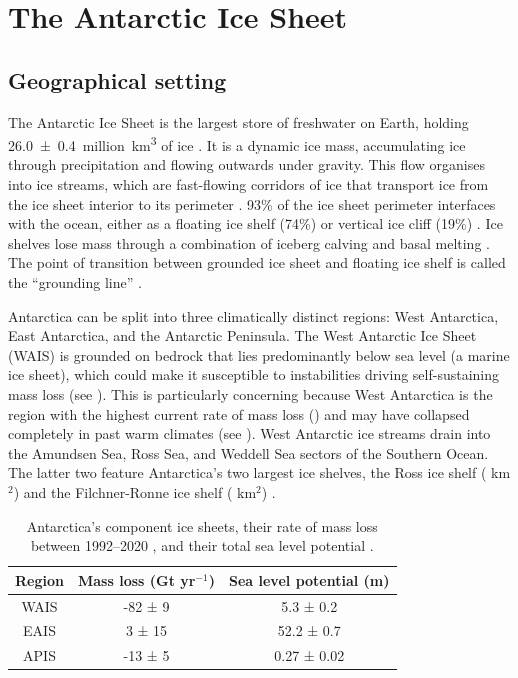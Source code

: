 \section{The Antarctic Ice Sheet}

\subsection{Geographical setting}

The Antarctic Ice Sheet is the largest store of freshwater on Earth, holding 26.0~±~0.4~million~km\textsuperscript{3} of ice \citep{morlighemDeepGlacialTroughs2020}. It is a dynamic ice mass, accumulating ice through precipitation and flowing outwards under gravity. This flow organises into ice streams, which are fast-flowing corridors of ice that transport ice from the ice sheet interior to its perimeter \citep{morlighemMEaSUREsBedMachineAntarctica2020}. 93\% of the ice sheet perimeter interfaces with the ocean, either as a floating ice shelf (74\%) or vertical ice cliff (19\%) \citep{bindschadlerGettingAntarcticaNew2011}. Ice shelves lose mass through a combination of iceberg calving and basal melting \citep{davisonAnnualMassBudget2023}. The point of transition between grounded ice sheet and floating ice shelf is called the ``grounding line'' \citep{friedlRemoteSensingGlacier2020}.

Antarctica can be split into three climatically distinct regions: West Antarctica, East Antarctica, and the Antarctic Peninsula. The West Antarctic Ice Sheet (WAIS) is grounded on bedrock that lies predominantly below sea level (a marine ice sheet), which could make it susceptible to instabilities driving self-sustaining mass loss (see ). This is particularly concerning because West Antarctica is the region with the highest current rate of mass loss () and may have collapsed completely in past warm climates (see ). West Antarctic ice streams drain into the Amundsen Sea, Ross Sea, and Weddell Sea sectors of the Southern Ocean. The latter two feature Antarctica's two largest ice shelves, the Ross ice shelf ( km$^2$) and the Filchner-Ronne ice shelf ( km$^2$) .

\begin{table}[h]
    \renewcommand{\arraystretch}{1.5}
    \centering
    \caption{Antarctica's component ice sheets, their rate of mass loss between 1992--2020 \citep{otosakaMassBalanceGreenland2023a}, and their total sea level potential \citep{morlighemDeepGlacialTroughs2020}.}
    \begin{tabular}{ccc}
        \toprule
        Region & Mass loss (Gt yr$^{-1}$) & Sea level potential (m) \\
        \midrule
        WAIS & -82 ± 9 & 5.3 ± 0.2 \\
        EAIS & 3 ± 15 & 52.2 ± 0.7 \\
        APIS & -13 ± 5 & 0.27 ± 0.02 \\
        \bottomrule
    \end{tabular}\label{table:component-ice-sheets}
\end{table}

